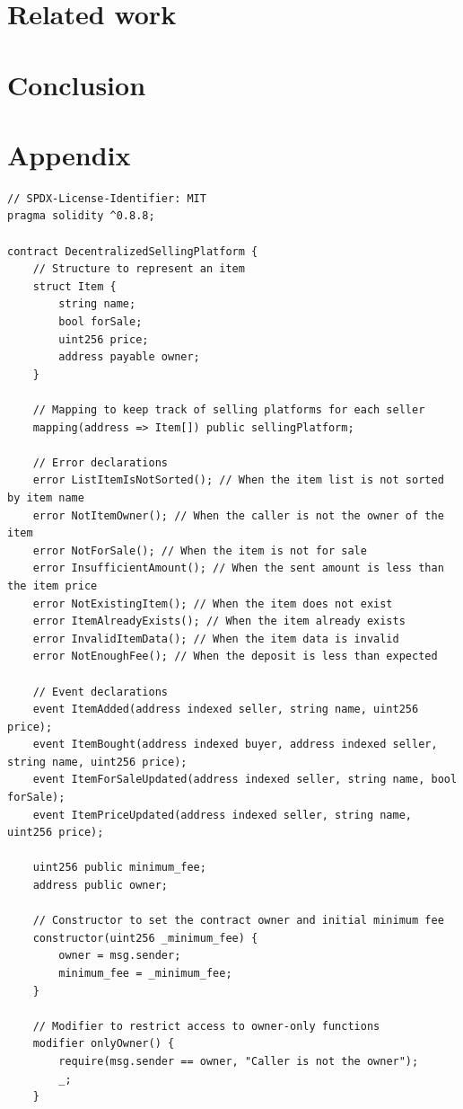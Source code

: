 \documentclass[runningheads]{llncs}
\begin{document}
\section{Related work}
\section{Conclusion}
\section{Appendix}
\begin{lstlisting}[numbers=none]
// SPDX-License-Identifier: MIT
pragma solidity ^0.8.8;

contract DecentralizedSellingPlatform {
    // Structure to represent an item
    struct Item {
        string name;
        bool forSale;
        uint256 price;
        address payable owner;
    }

    // Mapping to keep track of selling platforms for each seller
    mapping(address => Item[]) public sellingPlatform;

    // Error declarations
    error ListItemIsNotSorted(); // When the item list is not sorted by item name
    error NotItemOwner(); // When the caller is not the owner of the item
    error NotForSale(); // When the item is not for sale
    error InsufficientAmount(); // When the sent amount is less than the item price
    error NotExistingItem(); // When the item does not exist
    error ItemAlreadyExists(); // When the item already exists
    error InvalidItemData(); // When the item data is invalid
    error NotEnoughFee(); // When the deposit is less than expected

    // Event declarations
    event ItemAdded(address indexed seller, string name, uint256 price);
    event ItemBought(address indexed buyer, address indexed seller, string name, uint256 price);
    event ItemForSaleUpdated(address indexed seller, string name, bool forSale);
    event ItemPriceUpdated(address indexed seller, string name, uint256 price);

    uint256 public minimum_fee;
    address public owner;

    // Constructor to set the contract owner and initial minimum fee
    constructor(uint256 _minimum_fee) {
        owner = msg.sender;
        minimum_fee = _minimum_fee;
    }

    // Modifier to restrict access to owner-only functions
    modifier onlyOwner() {
        require(msg.sender == owner, "Caller is not the owner");
        _;
    }


\end{lstlisting}
\end{document}

